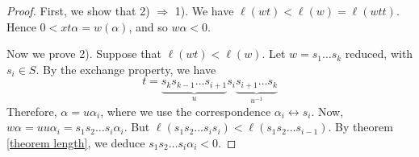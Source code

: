 \begin{proof}
First, we show that 2) $\Rightarrow$ 1). We have $\ell (w t) < \ell (w) = \ell (w t t)$. Hence $0<x t \alpha = w (\alpha)$, and so $w \alpha < 0$.

Now we prove 2). Suppose that $\ell (wt) < \ell (w)$. Let $w = s_1 \ldots s_k$ reduced, with $s_i \in S$. By the exchange property, we have
\begin{equation}
t = \underbrace{s_k s_{k-1} \ldots s_{i+1}}_{u} s_i \underbrace{s_{i+1} \ldots s_k}_{u^{-1}}
\end{equation} Therefore, $\alpha = u \alpha_i$, where we use the correspondence $\alpha_i \leftrightarrow s_i$. Now, $w \alpha = u u \alpha_i = s_1 s_2 \ldots s_i \alpha_i$. But $\ell (s_1 s_2 \ldots s_i s_i) < \ell (s_1 s_2 \ldots s_{i-1} )$. By theorem \ref{theorem length}, we deduce $s_1 s_2 \ldots s_i \alpha_i < 0$.
\end{proof}	
